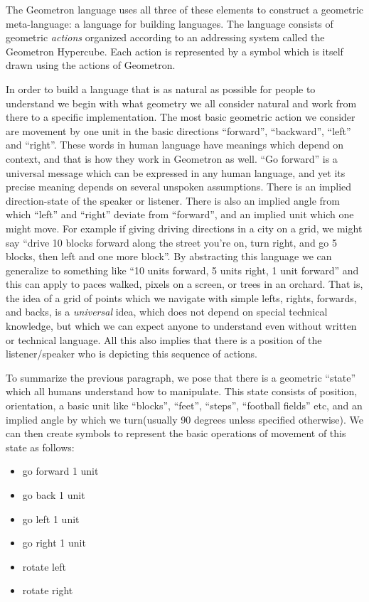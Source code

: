 The Geometron language uses all three of these elements to construct a
geometric meta-language: a language for building languages. The language
consists of geometric \emph{actions} organized according to an
addressing system called the Geometron Hypercube. Each action is
represented by a symbol which is itself drawn using the actions of
Geometron.

In order to build a language that is as natural as possible for people
to understand we begin with what geometry we all consider natural and
work from there to a specific implementation. The most basic geometric
action we consider are movement by one unit in the basic directions
``forward'', ``backward'', ``left'' and ``right''. These words in human
language have meanings which depend on context, and that is how they
work in Geometron as well. ``Go forward'' is a universal message which
can be expressed in any human language, and yet its precise meaning
depends on several unspoken assumptions. There is an implied
direction-state of the speaker or listener. There is also an implied
angle from which ``left'' and ``right'' deviate from ``forward'', and an
implied unit which one might move. For example if giving driving
directions in a city on a grid, we might say ``drive 10 blocks forward
along the street you're on, turn right, and go 5 blocks, then left and
one more block''. By abstracting this language we can generalize to
something like ``10 units forward, 5 units right, 1 unit forward'' and
this can apply to paces walked, pixels on a screen, or trees in an
orchard. That is, the idea of a grid of points which we navigate with
simple lefts, rights, forwards, and backs, is a \emph{universal} idea,
which does not depend on special technical knowledge, but which we can
expect anyone to understand even without written or technical language.
All this also implies that there is a position of the listener/speaker
who is depicting this sequence of actions.

To summarize the previous paragraph, we pose that there is a geometric
``state'' which all humans understand how to manipulate. This state
consists of position, orientation, a basic unit like ``blocks'',
``feet'', ``steps'', ``football fields'' etc, and an implied angle by
which we turn(usually 90 degrees unless specified otherwise). We can
then create symbols to represent the basic operations of movement of
this state as follows:

\begin{itemize}
\tightlist
\item
  go forward 1 unit
\item
  go back 1 unit
\item
  go left 1 unit
\item
  go right 1 unit
\item
  rotate left
\item
  rotate right
\end{itemize}

